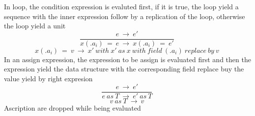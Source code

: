 \documentclass[10pt,a4paper]{article}
\begin{document}
In loop, the condition expression is evaluted first, if it is true, the loop yield a sequence with the inner expression follow by a replication of the loop, otherwise the loop yield a unit
\begin{equation}\frac{e\ \rightarrow \ e'}{x(.a_i)\ =\ e\ \rightarrow \ x(.a_i)\ =\ e'}\ \tag{\ E-ASSIGN1\ }\end{equation}
\begin{equation}x(.a_i)\ =\ v\ \rightarrow \ x'\ with\ x'\ as\ x\ with\ field\ (.a_i)\ replace\ by\ v\ \tag{\ E-ASSIGN2\ }\end{equation}
In an assign expression, the expression to be assign is evaluated first and then the expression yield the data structure with the corresponding field replace buy the value yield by right expresion
\begin{equation}\frac{e\ \rightarrow \ e'}{e\ as\ T\ \rightarrow \ e'\ as\ T}\ \tag{\ E-ASCR1\ }\end{equation}
\begin{equation}v\ as\ T \ \rightarrow \ v\ \tag{\ E-ASCR2\ }\end{equation}  
Ascription are dropped while being evaluated
\end{document}
